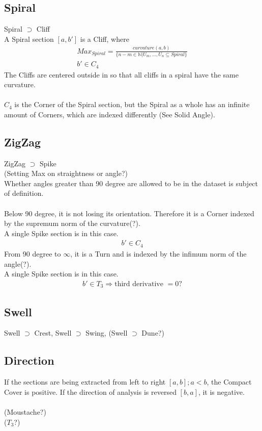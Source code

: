 \documentclass{report}
\begin{document}
\subsection{Spiral}
Spiral $\supset$ Cliff\\
A Spiral section $[a,b']$ is a Cliff, where
\begin{align}
Max_{Spiral}=\frac{curvature(a,b)}{\{n-m\in \mathbb{N} \vert U_{m},...,U_{n} \subseteq Spiral\}}\\
b' \in C_{4}
\end{align}
The Cliffs are centered outside in so that all cliffs in a spiral have the same curvature.\\\\
$C_{4}$ is the Corner of the Spiral section, but the Spiral as a whole has an infinite amount of Corners, which are indexed differently (See Solid Angle).
\subsection{ZigZag}
ZigZag $\supset$ Spike\\
(Setting Max on straightness or angle?)\\
Whether angles greater than 90 degree are allowed to be in the dataset is subject of definition.\\\\
Below 90 degree, it is not losing its orientation. Therefore it is a Corner indexed by the supremum norm of the curvature(?).\\
A single Spike section is in this case.
\begin{align}
b' \in C_{4}
\end{align}
From 90 degree to $\infty$, it is a Turn and is indexed by the infimum norm of the angle(?).\\
A single Spike section is in this case.
\begin{align}
b' \in T_{3} \Rightarrow \text{third derivative }= 0\text{?}
\end{align}
\subsection{Swell}
Swell $\supset$ Crest, Swell $\supset$ Swing, (Swell $\supset$ Dune?)
\subsection*{Direction}
If the sections are being extracted from left to right $[a,b];a<b$, the Compact Cover is positive. If the direction of analysis is reversed $[b,a]$, it is negative.\\\\
(Moustache?)\\
($T_{3}$?)

\printbibliography
\end{document}
